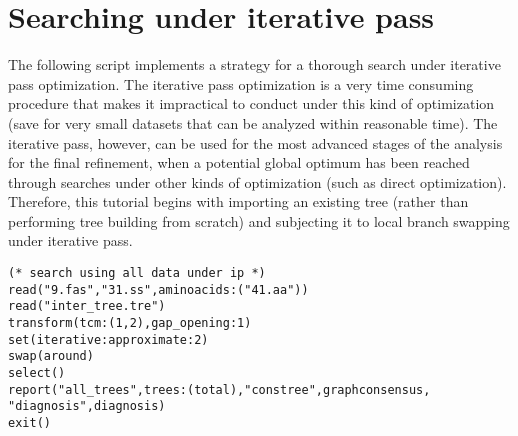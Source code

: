 \section{Searching under iterative pass}{\label{tutorial2}}
The following script implements a strategy for a thorough search under iterative pass optimization. The iterative pass optimization is a very time consuming procedure that makes it impractical to conduct under this kind of optimization (save for very small datasets that can be analyzed within reasonable time). The iterative pass, however, can be used for the most advanced stages of the analysis for the final refinement, when a potential global optimum has been reached through searches under other kinds of optimization (such as direct optimization). Therefore, this tutorial begins with importing an existing tree (rather than performing tree building from scratch) and subjecting it to local branch swapping under iterative pass.

\begin{verbatim}
(* search using all data under ip *)
read("9.fas","31.ss",aminoacids:("41.aa"))
read("inter_tree.tre")
transform(tcm:(1,2),gap_opening:1)
set(iterative:approximate:2)
swap(around)
select()
report("all_trees",trees:(total),"constree",graphconsensus,
"diagnosis",diagnosis)
exit()
\end{verbatim}


